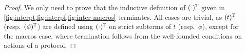 \begin{proof}
  We only need to prove that the inductive definition of $(\cdot)^{\mathbb{T}}$ given in \cref{fig:interpt,fig:interpf,fig:inter-macros} terminates. All cases are trivial, as $(t)^{\mathbb{T}}$ (resp.\ $(\phi)^{\mathbb{T}}$) are defined using $(\cdot)^{\mathbb{T}}$ on strict subterms of $t$ (resp.\ $\phi$), except for the macros case, where termination follows from the well-founded conditions on actions of a protocol.
\end{proof}





